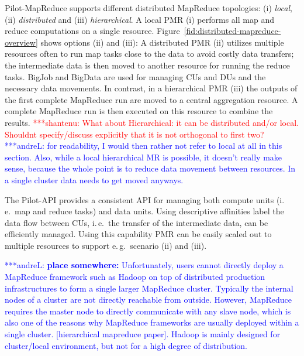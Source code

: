 \documentclass{acm_proc_article-sp}
\newcommand{\jhanote}[1]{ {\textcolor{red} { ***shantenu: #1 }}}
\newcommand{\alnote}[1]{ {\textcolor{blue} { ***andreL: #1 }}}
\newcommand{\alnote}[1]{}
\newcommand{\jhanote}[1]{}
\newcommand{\pilotmapreduce}{Pilot-MapReduce\xspace}
\begin{document}
\pilotmapreduce supports different distributed MapReduce topologies:
(i) \emph{local}, (ii) \emph{distributed} and (iii)
\emph{hierarchical}. A local PMR (i) performs all map and reduce
computations on a single resource.
Figure~\ref{fid:distributed-mapreduce-overview} shows options (ii) and
(iii): A distributed PMR (ii) utilizes multiple resources often to run
map tasks close to the data to avoid costly data transfers; the
intermediate data is then moved to another resource for running the
reduce tasks. BigJob and BigData are used for managing CUs and DUs and
the necessary data movements. In contrast, in a hierarchical PMR (iii)
the outputs of the first complete MapReduce run are moved to a central
aggregation resource. A complete MapReduce run is then executed on
this resource to combine the results. \jhanote{What about
  Hierarchical: it can be distributed and/or local. Shouldnt
  specify/discuss explicitly that it is not orthogonal to first two?} 
\alnote{for readability, I would then rather not refer to local at all in this 
section. Also, while a local hierarchical MR is possible, it doesn't really make 
sense, because the whole point is to reduce data movement between resources. In 
a single cluster data needs to get moved anyways.}


The Pilot-API provides a consistent API for managing both compute units (i.\,e.\ 
map and reduce tasks) and data units. Using descriptive affinities label the  
data flow between CUs, i.\,e.\ the transfer of the intermediate data, can be 
efficiently managed. Using this capability PMR can be easily scaled out to 
multiple resources to support e.\,g.\ scenario (ii) and (iii). 



\alnote{\textbf{place somewhere:} Unfortunately, users cannot directly deploy a MapReduce framework such as Hadoop
on top of distributed production infrastructures to form a single larger
MapReduce cluster. Typically the internal nodes of a cluster are not directly
reachable from outside. However, MapReduce requires the master node to directly
communicate with any slave node, which is also one of the reasons why MapReduce
frameworks are usually deployed within a single cluster. [hierarchical mapreduce
paper]. Hadoop is mainly designed for cluster/local environment, but not for a
high degree of distribution.}
\end{document}
